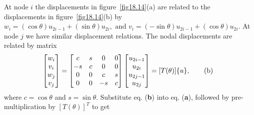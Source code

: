 \documentclass{AeroStructure-ERJohnson}
\begin{document}
\noindent
At node $i$ the displacements in figure~\ref{fig18.14}(a) are related to the displacements in figure~\ref{fig18.14}(b) by $w_{i}=(\cos \theta) u_{2 i-1}+(\sin \theta) u_{2 i},\text{ and }v_{i}=(-\sin \theta) u_{2 i-1}+(\cos \theta) u_{2 i}$. At node $j$ we have similar displacement relations. The nodal displacements are related by matrix
\begin{align}\label{eq18.7b}
\left[\begin{array}{@{}c@{}}w_{i} \\v_{i} \\w_{j} \\v_{j}\end{array}\right]=\left[\begin{array}{@{}cccc@{}}c & s & 0 & 0 \\-s & c & 0 & 0 \\0 & 0 & c & s \\0 & 0 & -s & c\end{array}\right]\left[\begin{array}{@{}c@{}}u_{2 i-1} \\u_{2 i} \\u_{2 j-1} \\u_{2 j}\end{array}\right]=[T(\theta)]\{u\},\tag{b}
\end{align}
where $c=\cos \theta$ and $s=\sin \theta$. Substitute eq. (\textbf{b}) into eq. (\textbf{a}), followed by pre-multiplication by $[T(\theta)]^{T}$ to get
\end{document}
